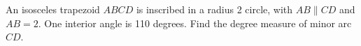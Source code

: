 An isosceles trapezoid $ABCD$ is inscribed in a radius 2 circle, with $AB\parallel CD$ and $AB=2$. One interior angle is 110 degrees. Find the degree measure of minor arc $CD$.
